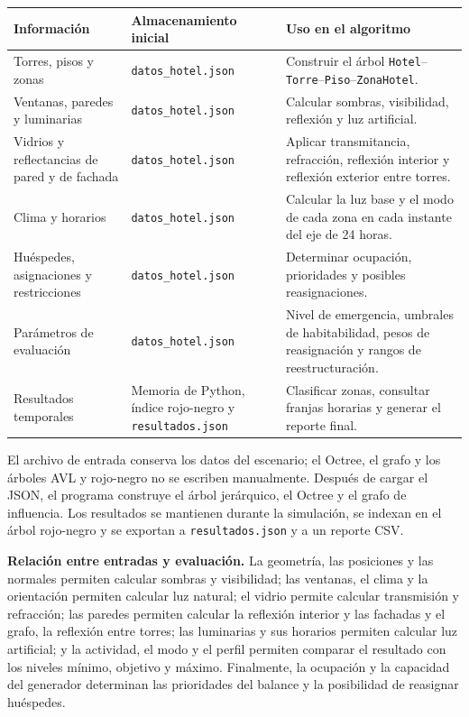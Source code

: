 \documentclass[12pt,a4paper]{article}
\newcommand{\clase}[1]{\texttt{#1}}
\newcommand{\codigo}[1]{\texttt{#1}}
\begin{document}
\begin{center}\small
\begin{tabular}{p{}p{}p{}}
\toprule
\textbf{Información} & \textbf{Almacenamiento inicial} & \textbf{Uso en el algoritmo}\\
\midrule
Torres, pisos y zonas & \codigo{datos\_hotel.json} & Construir el árbol \clase{Hotel}--\clase{Torre}--\clase{Piso}--\clase{ZonaHotel}.\\
Ventanas, paredes y luminarias & \codigo{datos\_hotel.json} & Calcular sombras, visibilidad, reflexión y luz artificial.\\
Vidrios y reflectancias de pared y de fachada & \codigo{datos\_hotel.json} & Aplicar transmitancia, refracción, reflexión interior y reflexión exterior entre torres.\\
Clima y horarios & \codigo{datos\_hotel.json} & Calcular la luz base y el modo de cada zona en cada instante del eje de 24 horas.\\
Huéspedes, asignaciones y restricciones & \codigo{datos\_hotel.json} & Determinar ocupación, prioridades y posibles reasignaciones.\\
Parámetros de evaluación & \codigo{datos\_hotel.json} & Nivel de emergencia, umbrales de habitabilidad, pesos de reasignación y rangos de reestructuración.\\
Resultados temporales & Memoria de Python, índice rojo-negro y \codigo{resultados.json} & Clasificar zonas, consultar franjas horarias y generar el reporte final.\\
\bottomrule
\end{tabular}
\end{center}

El archivo de entrada conserva los datos del escenario; el Octree, el grafo y los árboles AVL y rojo-negro no se escriben manualmente. Después de cargar el JSON, el programa construye el árbol jerárquico, el Octree y el grafo de influencia. Los resultados se mantienen durante la simulación, se indexan en el árbol rojo-negro y se exportan a \codigo{resultados.json} y a un reporte CSV.

\textbf{Relación entre entradas y evaluación.} La geometría, las posiciones y las normales permiten calcular sombras y visibilidad; las ventanas, el clima y la orientación permiten calcular luz natural; el vidrio permite calcular transmisión y refracción; las paredes permiten calcular la reflexión interior y las fachadas y el grafo, la reflexión entre torres; las luminarias y sus horarios permiten calcular luz artificial; y la actividad, el modo y el perfil permiten comparar el resultado con los niveles mínimo, objetivo y máximo. Finalmente, la ocupación y la capacidad del generador determinan las prioridades del balance y la posibilidad de reasignar huéspedes.
\end{document}
